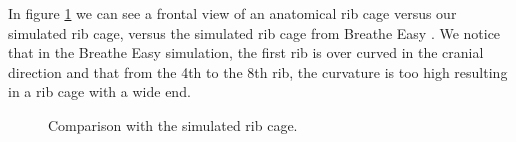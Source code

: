 In figure \ref{fig:thorax} we can see a frontal view of  an anatomical rib cage versus  our simulated rib cage, versus  the simulated rib cage from Breathe Easy \cite{dilorenzo2009breathing}. We notice that in the Breathe Easy simulation, the first rib is over curved in the cranial direction and that from the 4th to the 8th rib, the curvature is too high resulting in a rib cage with a wide end.

\begin{figure}[h]
\centering
{}
\caption[Comparison with the simulated rib cage]{\label{fig:thorax}Comparison with the simulated rib cage.}
\end{figure}		